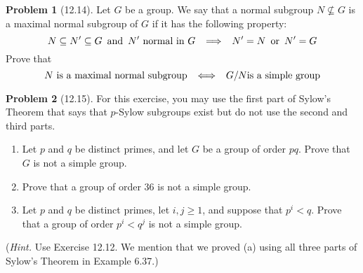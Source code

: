 \documentclass[12pt]{article}
\theoremstyle{definition}
\newtheorem{problem}{Problem}
\begin{document}
\begin{problem}[12.14]
    Let $G$ be a group. We say that a normal subgroup $N \not\subseteq G$ is a maximal normal subgroup of $G$
    if it has the following property:
    \[
        N \subseteq N' \subseteq G \hspace{5px} \text{and} \hspace{5px} N' \text{ normal in } G \hspace{5px} \implies \hspace{5px} N' = N \hspace{5px} \text{or} \hspace{5px} N' = G
    \]
    Prove that
    \[
        N \text{ is a maximal normal subgroup} \hspace{5px} \iff \hspace{5px} G/N \text{is a simple group}
    \]
    \begin{solution}

    \end{solution}
\end{problem}

\begin{problem}[12.15]
    For this exercise, you may use the first part of Sylow's Theorem that says that $p$-Sylow subgroups exist
    but do not use the second and third parts.
    \begin{enumerate}[label=(\alph*)]
        \item Let $p$ and $q$ be distinct primes, and let $G$ be a group of order $pq$. Prove that $G$ is not
              a simple group.
        \begin{solution}

        \end{solution}

        \item Prove that a group of order 36 is not a simple group.
        \begin{solution}

        \end{solution}

        \item Let $p$ and $q$ be distinct primes, let $i, j \geq 1$, and suppose that $p^i < q$.
              Prove that a group of order $p^i < q^j$ is not a simple group. 
        \begin{solution}

        \end{solution}
    \end{enumerate}
    (\textit{Hint.} Use Exercise 12.12. We mention that we proved (a) using all three 
    parts of Sylow's Theorem in Example 6.37.)
\end{problem}
\end{document}
